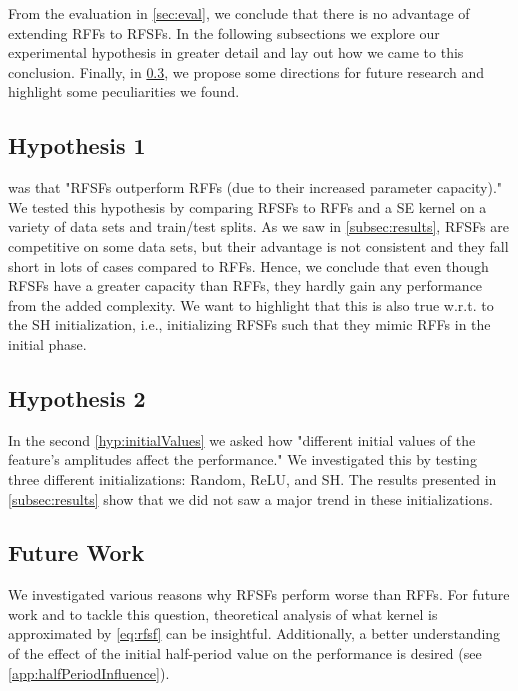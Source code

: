 From the evaluation in \cref{sec:eval}, we conclude that there is no advantage of extending \acp{RFF} to \acp{RFSF}.
In the following subsections we explore our experimental hypothesis in greater detail and lay out how we came to this conclusion.
Finally, in \cref{subsec:future}, we propose some directions for future research and highlight some peculiarities we found.

\subsection{Hypothesis 1}
	 was that "\acp{RFSF} outperform \acp{RFF} (due to their increased parameter capacity)."
	We tested this hypothesis by comparing \acp{RFSF} to \acp{RFF} and a \ac{SE} kernel on a variety of data sets and train/test splits.
	As we saw in \cref{subsec:results}, \acp{RFSF} are competitive on some data sets, but their advantage is not consistent and they fall short in lots of cases compared to \acp{RFF}.
	Hence, we conclude that even though \acp{RFSF} have a greater capacity than \acp{RFF}, they hardly gain any performance from the added complexity.
	We want to highlight that this is also true w.r.t. to the \ac{SH} initialization, i.e., initializing \acp{RFSF} such that they mimic \acp{RFF} in the initial phase.

\subsection{Hypothesis 2}
	In the second \cref{hyp:initialValues} we asked how "different initial values of the feature's amplitudes affect the performance."
	We investigated this by testing three different initializations: Random, \ac{ReLU}, and \ac{SH}.
	The results presented in \cref{subsec:results} show that we did not saw a major trend in these initializations.

\subsection{Future Work}  \label{subsec:future}
	We investigated various reasons why \acp{RFSF} perform worse than \acp{RFF}.
	For future work and to tackle this question, theoretical analysis of what kernel is approximated by \cref{eq:rfsf} can be insightful.
	Additionally, a better understanding of the effect of the initial half-period value on the performance is desired (see \cref{app:halfPeriodInfluence}).
